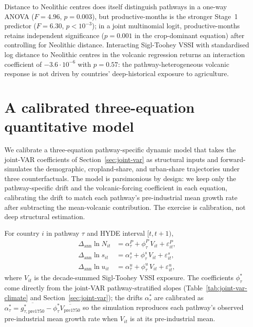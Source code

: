 \documentclass[11pt,letterpaper]{article}
\begin{document}
Distance to Neolithic centres does itself distinguish pathways in a one-way ANOVA ($F=4.96$, $p=0.003$), but productive-months is the stronger Stage~1 predictor ($F=6.30$, $p<10^{-3}$); in a joint multinomial logit, productive-months retains independent significance ($p=0.001$ in the crop-dominant equation) after controlling for Neolithic distance. Interacting Sigl-Toohey VSSI with standardised log distance to Neolithic centres in the volcanic regression returns an interaction coefficient of $-3.6 \cdot 10^{-6}$ with $p=0.57$: the pathway-heterogeneous volcanic response is not driven by countries' deep-historical exposure to agriculture.

\section{A calibrated three-equation quantitative model}
\label{app:calibrated-model}

We calibrate a three-equation pathway-specific dynamic model that takes the joint-VAR coefficients of Section~\ref{sec:joint-var} as structural inputs and forward-simulates the demographic, cropland-share, and urban-share trajectories under three counterfactuals. The model is parsimonious by design: we keep only the pathway-specific drift and the volcanic-forcing coefficient in each equation, calibrating the drift to match each pathway's pre-industrial mean growth rate after subtracting the mean-volcanic contribution. The exercise is calibration, not deep structural estimation.

For country $i$ in pathway $\tau$ and HYDE interval $[t, t+1)$,
\begin{align}
\Delta_{\text{ann}} \ln N_{it} &= \alpha^P_\tau + \phi^P_\tau\, V_{it} + \varepsilon^P_{it},\label{eq:struct-pop}\\
\Delta_{\text{ann}} \ln s_{it} &= \alpha^s_\tau + \phi^s_\tau\, V_{it} + \varepsilon^s_{it},\label{eq:struct-crop}\\
\Delta_{\text{ann}} \ln u_{it} &= \alpha^u_\tau + \phi^u_\tau\, V_{it} + \varepsilon^u_{it},\label{eq:struct-urb}
\end{align}
where $V_{it}$ is the decade-summed Sigl-Toohey VSSI exposure. The coefficients $\phi^*_\tau$ come directly from the joint-VAR pathway-stratified slopes (Table~\ref{tab:joint-var-climate} and Section~\ref{sec:joint-var}); the drifts $\alpha^*_\tau$ are calibrated as $\alpha^*_\tau = \overline{g^*_{\tau,\text{pre1750}}} - \phi^*_\tau \overline{V_{\text{pre1750}}}$ so the simulation reproduces each pathway's observed pre-industrial mean growth rate when $V_{it}$ is at its pre-industrial mean.
\end{document}
